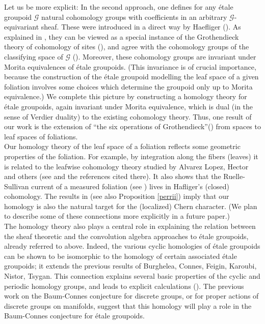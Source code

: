 \documentclass[a4paper]{article}
\newcommand{\G}{\ensuremath{\mathcal{G}}}
\begin{document}
\hspace*{.3in} Let us be more explicit: In the second approach, one defines for any \'etale groupoid $\G$ natural cohomology groups with coefficients in an arbitrary $\G$-equivariant sheaf. These were introduced in a direct way by Haefliger (\cite{difcoh}). As explained in \cite{Fourier}, they can be viewed as a special instance of the Grothendieck theory of cohomology of sites (\cite{SGA}), and agree with the cohomology groups of the classifying space of $\G$ (\cite{emb}). Moreover, these cohomology groups are invariant under Morita equivalences of \'etale groupoids. (This invariance is of crucial importance, because the construction of the \'etale groupoid modelling the leaf space of a given foliation involves some choices which determine the groupoid only up to Morita equivalence.) We complete this picture by constructing a homology theory for \'etale groupoids, again invariant under Morita equivalence, which is dual (in the sense of Verdier duality) to the existing cohomology theory. Thus, one result of our work is the extension of ``the six operations of Grothendieck''(\cite{SGA}) from spaces to leaf spaces of foliations.\\\hspace*{.3in}   Our homology theory of the leaf space of a foliation reflects some geometric properties of the foliation. For example, by integration along the fibers (leaves) it is related to the leafwise cohomology theory studied by   Alvarez Lopez, Hector and others (see \cite{alv} and the references cited there). It also shows that the Ruelle-Sullivan current of a measured foliation (see \cite{CoOp}) lives in Hafliger's (closed) cohomology. The results in \cite{BrNi, Cra} (see also Proposition \ref{perrii}) imply that our homology is also the natural target for the (localized) Chern character. (We plan to describe some of these connections more explicitly in a future paper.)\\
\hspace*{.3in} The homology theory also plays a central role in explaining the relation between the sheaf theoretic and the convolution algebra approaches to \'etale groupoids, already referred to above. Indeed, the various cyclic homologies of \'etale groupoids can be shown to be isomorphic to the homology of certain associated \'etale groupoids; it extends the previous results of Burghelea, Connes, Feigin, Karoubi, Nistor, Tsygan. This connection explains several basic properties of the cyclic and periodic homology groups, and leads to explicit calculations (\cite{Cra}). The previous work on the Baum-Connes conjecture for discrete groups, or for proper actions of discrete groups on manifolds, suggest that this homology will play a role in the Baum-Connes conjecture for \'etale groupoids.\\
\end{document}

